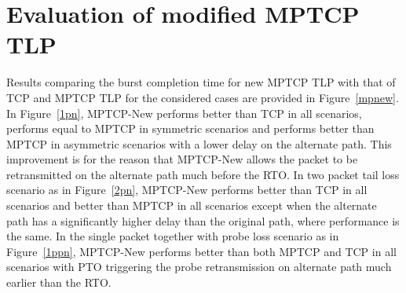 \documentclass[10pt,conference,compsoc]{IEEEtran}
\begin{document}
\section{Evaluation of modified MPTCP TLP}\label{eval}


Results comparing the burst completion time for new MPTCP TLP with that of TCP and MPTCP TLP for the considered cases are provided in Figure~\ref{mpnew}. In Figure~\ref{1pn}, MPTCP-New performs better than TCP in all scenarios, performs equal to MPTCP in symmetric scenarios and performs better than MPTCP in asymmetric scenarios with a lower delay on the alternate path. This improvement is for the reason that MPTCP-New allows the packet to be retransmitted on the alternate path much before the RTO. In two packet tail loss scenario as in Figure~\ref{2pn}, MPTCP-New performs better than TCP in all scenarios and better than MPTCP in all scenarios except when the alternate path has a significantly higher delay than the original path, where performance is the same. In the single packet together with probe loss scenario as in Figure~\ref{1ppn}, MPTCP-New performs better than both MPTCP and TCP in all scenarios with PTO triggering the probe retransmission on alternate path much earlier than the RTO.
\end{document}
